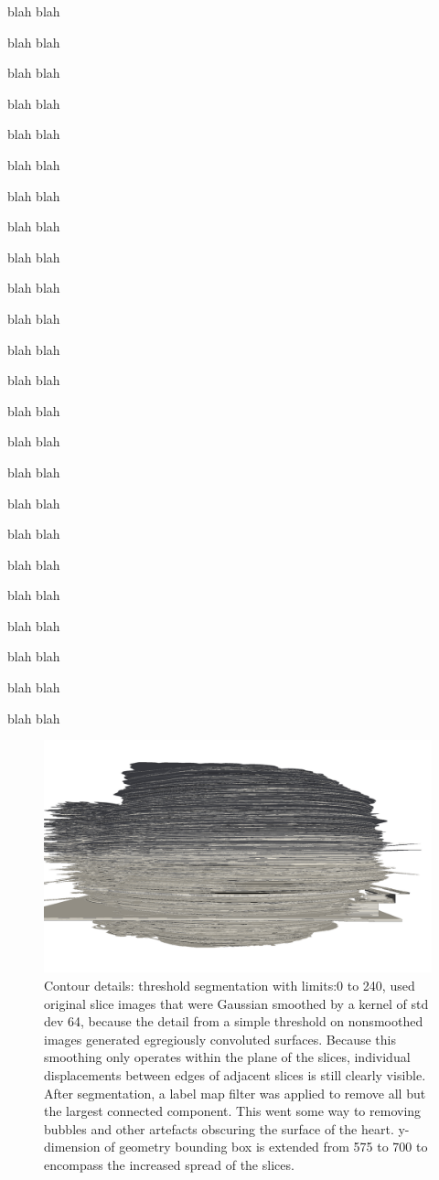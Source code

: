 blah blah

blah blah

blah blah

blah blah

blah blah

blah blah

blah blah

blah blah

blah blah

blah blah

blah blah

blah blah

blah blah

blah blah

blah blah

blah blah

blah blah

blah blah

blah blah

blah blah

blah blah

blah blah

blah blah

blah blah

\begin{figure}
  \centering
  \includegraphics[width=0.9\textheight]{Ch7/Figs/Rat28/contours/whole_positive_x_geometric}
  \caption{Contour details: threshold segmentation with limits:0 to 240, used original slice images that were Gaussian smoothed by a kernel of std dev 64, because the detail from a simple threshold on nonsmoothed images generated egregiously convoluted surfaces. Because this smoothing only operates within the plane of the slices, individual displacements between edges of adjacent slices is still clearly visible. After segmentation, a label map filter was applied to remove all but the largest connected component. This went some way to removing bubbles and other artefacts obscuring the surface of the heart. y-dimension of geometry bounding box is extended from 575 to 700 to encompass the increased spread of the slices.}
  \label{fig:image1.png}
\end{figure}

